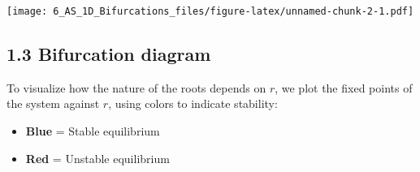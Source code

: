 \documentclass[
]{article}
\providecommand{\tightlist}{%
  \setlength{\itemsep}{0pt}\setlength{\parskip}{0pt}}
\begin{document}
\texttt{[image: 6\_AS\_1D\_Bifurcations\_files/figure-latex/unnamed-chunk-2-1.pdf]}

\subsection{\texorpdfstring{\textbf{1.3 Bifurcation
diagram}}{1.3 Bifurcation diagram}}\label{bifurcation-diagram}

To visualize how the nature of the roots depends on \(r\), we plot the
fixed points of the system against \(r\), using colors to indicate
stability:

\begin{itemize}
\tightlist
\item
  \textbf{Blue} = Stable equilibrium
\item
  \textbf{Red} = Unstable equilibrium
\end{itemize}
\end{document}
